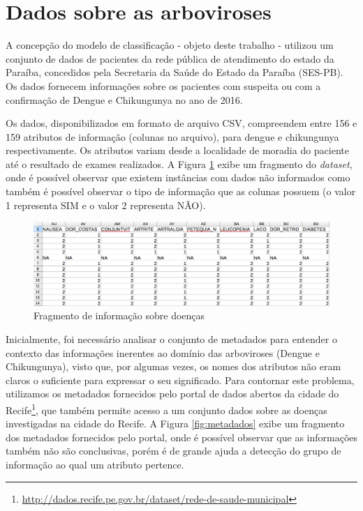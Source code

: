 \section{Dados sobre as arboviroses}

A concepção do modelo de classificação - objeto deste trabalho - utilizou um conjunto de dados de pacientes da rede pública de atendimento do estado da Paraíba, concedidos pela Secretaria da Saúde do Estado da Paraíba (SES-PB). Os dados fornecem informações sobre os pacientes com suspeita ou com a confirmação de Dengue e Chikungunya no ano de 2016.

Os dados, disponibilizados em formato de arquivo CSV, compreendem entre 156 e 159 atributos de informação (colunas no arquivo), para dengue e chikungunya respectivamente. Os atributos variam desde a localidade de moradia do paciente até o resultado de exames realizados. A Figura \ref{fig:csvses} exibe um fragmento do \textit{dataset}, onde é possível observar que existem instâncias com dados não informados como também é possível observar o tipo de informação que as colunas possuem (o valor 1 representa SIM e o valor 2 representa NÃO).

\begin{figure}[htb]
  \caption{\label{fig:csvses}Fragmento de informação sobre doenças}
  \begin{center}
    \includegraphics[width=\textwidth]{imagens/fragmentodosdados.png}
  \end{center}
\end{figure}

Inicialmente, foi necessário analisar o conjunto de metadados para entender o contexto das informações inerentes ao domínio das arboviroses (Dengue e Chikungunya), visto que, por algumas vezes, os nomes dos atributos não eram claros o suficiente para expressar o seu significado. Para contornar este problema, utilizamos os metadados fornecidos pelo portal de dados abertos da cidade do Recife\footnote{\url{http://dados.recife.pe.gov.br/dataset/rede-de-saude-municipal}}, que também permite acesso a um conjunto dados sobre as doenças investigadas na cidade do Recife. A Figura \ref{fig:metadados} exibe um fragmento dos metadados fornecidos pelo portal, onde é possível observar que as informações também não são conclusivas, porém é de grande ajuda a detecção do grupo de informação ao qual um atributo pertence.

